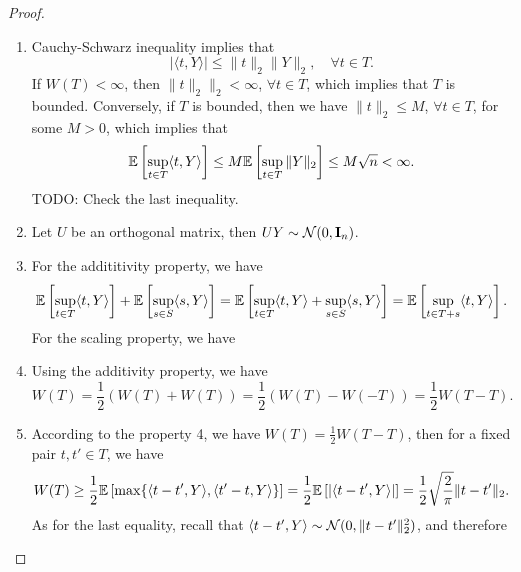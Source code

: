 \begin{proof}
    \begin{enumerate}
        \item Cauchy-Schwarz inequality implies that
            \begin{equation*}
                |\langle t,Y\rangle|\leq\|t\|_{2}\|Y\|_{2},\quad\forall t\in T.
            \end{equation*}
            If \(W(T)<\infty\), then \(\|t\|_{2}\|_{2}<\infty\), \(\forall t\in T\), which implies that \(T\) is bounded. Conversely, if \(T\) is bounded, then we have \(\|t\|_{2}\leq M\), \(\forall t\in T\), for some \(M>0\), which implies that
            \begin{equation*}
                {\mathbb E}\left[\sup_{t\in T}\langle t,Y\rangle\right]\leq M{\mathbb E}\left[\sup_{t\in T}\|Y\|_{2}\right]\leq M\sqrt{n}<\infty.
            \end{equation*}
            TODO: Check the last inequality.
        \item Let \(U\) be an orthogonal matrix, then \(UY\sim{\mathcal N}(0,{\bf I}_{n})\).
        \item For the addititivity property, we have
            \begin{equation*}
                {\mathbb E}\left[\sup_{t\in T}\langle t,Y\rangle\right]+{\mathbb E}\left[\sup_{s\in S}\langle s,Y\rangle\right]={\mathbb E}\left[\sup_{t\in T}\langle t,Y\rangle+\sup_{s\in S}\langle s,Y\rangle\right]={\mathbb E}\left[\sup_{t\in T+s}\langle t,Y\rangle\right].
            \end{equation*}
            For the scaling property, we have
        \item Using the additivity property, we have
            \begin{equation*}
                W(T)=\frac{1}{2}(W(T)+W(T))=\frac{1}{2}(W(T)-W(-T))=\frac{1}{2}W(T-T).
            \end{equation*} 
        \item According to the property 4, we have \(W(T)=\frac{1}{2}W(T-T)\), then for a fixed pair \(t,t'\in T\), we have
            \begin{equation*}
                W(T)\geq \frac{1}{2}{\mathbb E}\left[\max\{\langle t-t',Y\rangle,\langle t'-t,Y\rangle\}\right]=\frac{1}{2}{\mathbb E}\left[|\langle t-t',Y\rangle|\right]=\frac{1}{2}\sqrt{\frac{2}{\pi}}\|t-t'\|_{2}.
            \end{equation*}
            As for the last equality, recall that \(\langle t-t',Y\rangle\sim{\mathcal N}(0,\|t-t'\|_{2}^{2})\), and therefore
            \begin{equation*}

\end{equation*}
\end{enumerate}
\end{proof}
